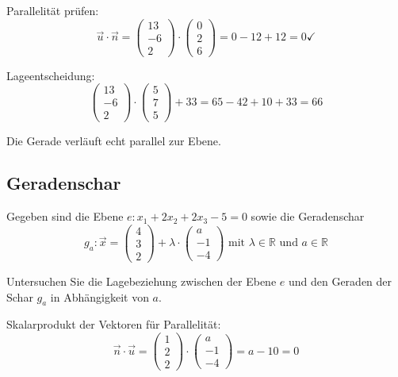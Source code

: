 \documentclass{ajc}
\numberwithin{equation}{subsection}
\begin{document}
	Parallelität prüfen:
	\begin{equation}
		\vec{u} \cdot \vec{n} = \left(\begin{array}{r} 13 \\ -6 \\ 2\end{array}\right) \cdot \left(\begin{array}{r} 0 \\ 2 \\ 6\end{array}\right) = 0 - 12 + 12 = 0 \checkmark
	\end{equation}
	
	Lageentscheidung:
	\begin{equation}
		\left(\begin{array}{r} 13 \\ -6 \\ 2\end{array}\right) \cdot \left(\begin{array}{r} 5 \\ 7 \\ 5\end{array}\right) + 33 = 65 - 42 + 10 + 33 = 66
	\end{equation}
	
	Die Gerade verläuft echt parallel zur Ebene.
	
	\subsection{Geradenschar}
	Gegeben sind die Ebene $e: x_1 + 2x_2 + 2x_3 - 5 = 0$ sowie die Geradenschar
	\begin{equation}
		g_a: \vec{x} = \left(\begin{array}{r} 4 \\ 3 \\ 2\end{array}\right) + \lambda \cdot \left(\begin{array}{r} a \\ -1 \\ -4\end{array}\right) \text{ mit } \lambda \in \mathbb{R} \text{ und } a \in \mathbb{R}
	\end{equation}
	
	Untersuchen Sie die Lagebeziehung zwischen der Ebene $e$ und den Geraden der Schar $g_a$ in Abhängigkeit von $a$.
	
	Skalarprodukt der Vektoren für Parallelität:
	\begin{equation}
		\vec{n}\cdot\vec{u} = \left(\begin{array}{r} 1 \\ 2 \\ 2\end{array}\right) \cdot \left(\begin{array}{r} a \\ -1 \\ -4\end{array}\right) = a - 10 = 0
	\end{equation}
	
\end{document}
